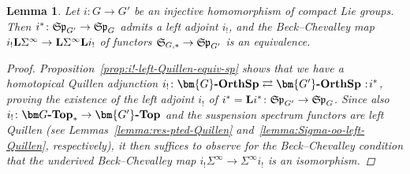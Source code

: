 \documentclass[reqno]{memo-l}
\theoremstyle{mythm}
\newtheorem{lemma}[thm]{Lemma}
\theoremstyle{definition}
\numberwithin{equation}{section}
\newcommand{\cat}[1]{\textbf{\textup{#1}}}
\newcommand\noloc{%
	\nobreak
	\mspace{6mu plus 1mu}
	{:}
	\nonscript\mkern-\thinmuskip
	\mathpunct{}
	\mspace{2mu}
}
\newcommand{\mySp}{{\mathfrak S\kern-.5pt\mathfrak p}}
\newcommand{\myS}{{{\mathfrak S\kern-.4pt}}}
\newcommand{\Gosp}[1]{\cat{$\bm{#1}$-OrthSp}}
\begin{document}
\begin{lemma}\label{lemma:Sigma-oo-equiv-left-adjointable}
    Let $i\colon G\to G'$ be an injective homomorphism of compact Lie groups. Then $i^*\colon\mySp_{G'}\to\mySp_G$ admits a left adjoint $i_!$, and the Beck--Chevalley map $i_!\cat{L}\Sigma^\infty\to\cat{L}\Sigma^\infty\cat{L}i_!$ of functors $\myS_{G,*}\to\mySp_{G'}$ is an equivalence.
    \begin{proof}
        Proposition~\ref{prop:i!-left-Quillen-equiv-sp} shows that we have a homotopical Quillen adjunction $i_!\colon\Gosp{G}\rightleftarrows\Gosp{G'}\noloc i^*$, proving the existence of the left adjoint $i_!$ of $i^*=\cat{L}i^*\colon\mySp_{G'}\to\mySp_G$. Since also $i_!\colon\cat{$\bm G$-Top}_*\to\cat{$\bm{G'}$-Top}$ and the suspension spectrum functors are left Quillen (see Lemmas~\ref{lemma:res-pted-Quillen} and~\ref{lemma:Sigma-oo-left-Quillen}, respectively), it then suffices to observe for the Beck--Chevalley condition that the \emph{underived} Beck--Chevalley map $i_!\Sigma^\infty\to\Sigma^\infty i_!$ is an isomorphism.
    \end{proof}
\end{lemma}
\end{document}
